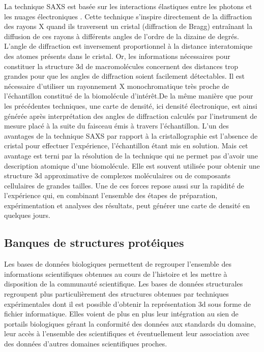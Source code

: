 La technique SAXS est basée sur les interactions élastiques entre les photons et les nuages électroniques \cite{guimer1955small}. Cette technique s'inspire directement de la diffraction des rayons X quand ils traversent un cristal (diffraction de Bragg) entraînant la diffusion de ces rayons à différents angles de l'ordre de la dizaine de degrés. L'angle de diffraction est inversement proportionnel à la distance interatomique des atomes présents dans le cristal. Or, les informations nécessaires pour constituer la structure 3d de macromolécules concernent des distances trop grandes pour que les angles de diffraction soient facilement détectables. Il est nécessaire d'utiliser un rayonnement X monochromatique très proche de l'échantillon constitué de la biomolécule d'intérêt.De la même manière que pour les précédentes techniques, une carte de densité, ici densité électronique, est ainsi générée après interprétation des angles de diffraction calculés par l'instrument de mesure placé à la suite du faisceau émis à travers l'échantillon.
L'un des avantages de la technique SAXS par rapport à la cristallographie est l'absence de cristal pour effectuer l'expérience, l'échantillon étant mis en solution. Mais cet avantage est terni par la résolution de la technique qui ne permet pas d'avoir une description atomique d'une biomolécule. Elle est souvent utilisée pour obtenir une structure 3d approximative de complexes moléculaires ou de composants cellulaires de grandes tailles. Une de ces forces repose aussi sur la rapidité de l'expérience qui, en combinant l'ensemble des étapes de préparation, expérimentation et analyses des résultats, peut générer une carte de densité en quelques jours.

\subsection{Banques de structures protéiques}

Les bases de données biologiques permettent de regrouper l'ensemble des informations scientifiques obtenues au cours de l'histoire et les mettre à disposition de la communauté scientifique. Les bases de données structurales regroupent plus particulièrement des structures obtenues par techniques expérimentales dont il est possible d'obtenir la représentation 3d sous forme de fichier informatique. 
Elles voient de plus en plus leur intégration au sien de portails biologiques gérant la conformité des données aux standards du domaine, leur accès à l'ensemble des scientifiques et éventuellement leur association avec des données d'autres domaines scientifiques proches.

